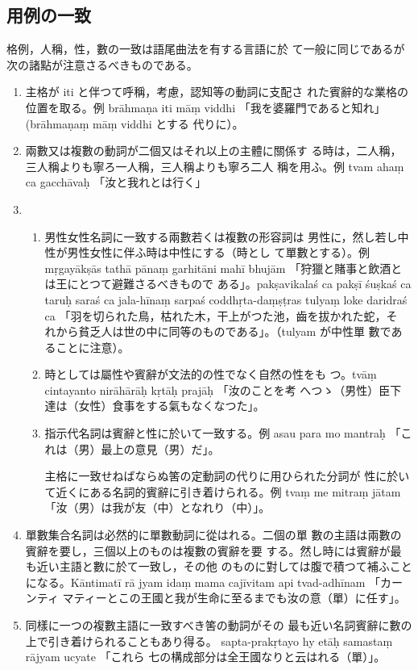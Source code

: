 \subsection{用例の一致}
\numberParagraph \label{np:219}
格例，人稱，性，數の一致は語尾曲法を有する言語に於
て一般に同じであるが次の諸點が注意さるべきものである。
\begin{enumerate}[label=(\arabic*)]
\item \label{item:2191} 主格が iti と伴つて呼稱，考慮，認知等の動詞に支配さ
れた賓辭的な業格の位置を取る。例 brāhmaṇa iti māṃ viddhi
「我を婆羅門であると知れ」(brāhmaṇaṃ māṃ viddhi とする
代りに）。
\item 兩數又は複數の動詞が二個又はそれ以上の主體に關係す
る時は，二人稱，三人稱よりも寧ろ一人稱，三人稱よりも寧ろ二人
稱を用ふ。例 tvam ahaṃ ca gacchāvaḥ 「汝と我れとは行く」
\item
\begin{enumerate}[label=(\alph*)]
\item 男性女性名詞に一致する兩數若くは複數の形容詞は
男性に，然し若し中性が男性女性に伴ふ時は中性にする（時とし
て單數とする）。例 mṛgayākṣās tathā pānaṃ garhitāni mahī\-%
bhujām 「狩獵と賭事と飲酒とは王にとつて避難さるべきもので
ある」。pakṣa\-vikalaś ca pakṣī śuṣkaś ca taruḥ saraś ca
jala-hīnaṃ sarpaś coddhṛta-daṃṣṭras tulyaṃ loke daridraś ca
「羽を切られた鳥，枯れた木，干上がつた池，齒を拔かれた蛇，そ
れから貧乏人は世の中に同等のものである」。（tulyam が中性單
數であることに注意）。
\item 時としては屬性や賓辭が文法的の性でなく自然の性をも
つ。tvāṃ cintayanto nirāhārāḥ kṛtāḥ prajāḥ 「汝のことを考
へつゝ（男性）臣下達は（女性）食事をする氣もなくなつた」。
\item 指示代名詞は賓辭と性に於いて一致する。例 asau para\-%
mo mantraḥ 「これは（男）最上の意見（男）だ」。

主格に一致せねばならぬ筈の定動詞の代りに用ひられた分詞が
性に於いて近くにある名詞的賓辭に引き着けられる。例 tvaṃ
me mitraṃ jātam 「汝（男）は我が友（中）となれり（中）」。
\end{enumerate}
\item 單數集合名詞は必然的に單數動詞に從はれる。二個の單
數の主語は兩數の賓辭を要し，三個以上のものは複數の賓辭を要
する。然し時には賓辭が最も近い主語と數に於て一致し，その他
のものに對しては腹で積つて補ふことになる。Kāntimatī rā\-%
jyam idaṃ mama cajīvitam api tvad-adhīnam 「カーンティ
マティーとこの王國と我が生命に至るまでも汝の意（單）に任す」。
\item 同樣に一つの複數主語に一致すべき筈の動詞がその
最も近い名詞賓辭に數の上で引き着けられることもあり得る。
sapta-prakṛtayo hy etāḥ samastaṃ rājyam ucyate 「これら
七の構成部分は全王國なりと云はれる（單）」。
\end{enumerate}


